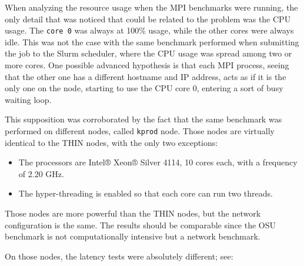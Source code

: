 When analyzing the resource usage when the MPI benchmarks were running, the only
detail that was noticed that could be related to the problem was the CPU usage.
The \texttt{core 0} was always at 100\%  usage, while the other cores were
always idle.
This was not the case with the same benchmark performed when submitting the job
to the Slurm scheduler, where the CPU usage was spread among two or more cores.
One possible advanced hypothesis is that each MPI process, seeing that the other
one has a different hostname and IP address, acts as if it is the only one on
the node, starting to use the CPU core 0, entering a sort of busy waiting loop.

This supposition was corroborated by the fact that the same benchmark was
performed on different nodes, called \texttt{kprod} node. Those nodes are
virtually identical to the THIN nodes, with the only two exceptions:


\begin{itemize}
  \itemsep0em
  \item The processors are Intel® Xeon® Silver 4114, 10 cores each, with a
    frequency of 2.20 GHz.
  \item The hyper-threading is enabled so that each core can run two threads.
\end{itemize}

Those nodes are more powerful than the THIN nodes, but the network configuration
is the same. The results should be comparable since the OSU benchmark is not
computationally intensive but a network benchmark.

On those nodes, the latency tests were absolutely different; see:


